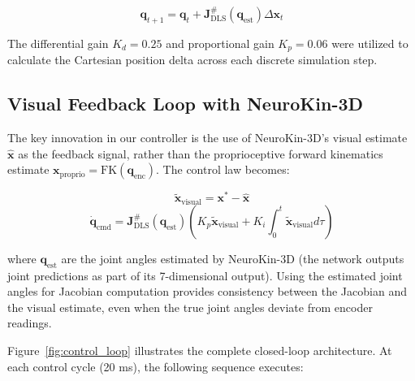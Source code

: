 \documentclass[12pt,a4paper,oneside]{report}
\begin{document}
\begin{equation}
\mathbf{q}_{t+1} = \mathbf{q}_t + \mathbf{J}^{\#}_{\text{DLS}}(\mathbf{q}_{\text{est}}) \Delta \mathbf{x}_t
\end{equation}

The differential gain $K_d = 0.25$ and proportional gain $K_p = 0.06$ were utilized to calculate the Cartesian position delta across each discrete simulation step.

\subsection{Visual Feedback Loop with NeuroKin-3D}
\label{subsec:visual_feedback_loop_with_neurokin_3d}

The key innovation in our controller is the use of NeuroKin-3D's visual estimate $\hat{\mathbf{x}}$ as the feedback signal, rather than the proprioceptive forward kinematics estimate $\mathbf{x}_{\text{proprio}} = \text{FK}(\mathbf{q}_{\text{enc}})$. The control law becomes:

\begin{equation}
\tilde{\mathbf{x}}_{\text{visual}} = \mathbf{x}^* - \hat{\mathbf{x}}
\end{equation}
\begin{equation}
\dot{\mathbf{q}}_{\text{cmd}} = \mathbf{J}^{\#}_{\text{DLS}}(\mathbf{q}_{\text{est}}) \left( K_p \tilde{\mathbf{x}}_{\text{visual}} + K_i \int_0^t \tilde{\mathbf{x}}_{\text{visual}} d\tau \right)
\end{equation}

where $\mathbf{q}_{\text{est}}$ are the joint angles estimated by NeuroKin-3D (the network outputs joint predictions as part of its 7-dimensional output). Using the estimated joint angles for Jacobian computation provides consistency between the Jacobian and the visual estimate, even when the true joint angles deviate from encoder readings.

Figure~\ref{fig:control_loop} illustrates the complete closed-loop architecture. At each control cycle (20 ms), the following sequence executes:
\end{document}
